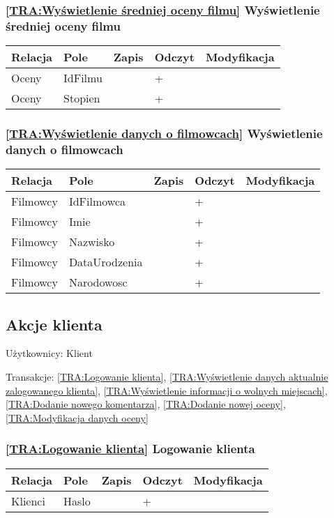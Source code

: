 \subsubsection*{\ref{TRA:Wyświetlenie średniej oceny filmu} Wyświetlenie średniej oceny filmu}
\begin{tabularx}{\textwidth}{|Y|Y|Y|Y|Y|}\hline
Relacja & Pole & Zapis & Odczyt & Modyfikacja \\\hline
Oceny & IdFilmu &  & + & \\
Oceny & Stopien &  & + & \\
\hline\end{tabularx}
\subsubsection*{\ref{TRA:Wyświetlenie danych o filmowcach} Wyświetlenie danych o filmowcach}
\begin{tabularx}{\textwidth}{|Y|Y|Y|Y|Y|}\hline
Relacja & Pole & Zapis & Odczyt & Modyfikacja \\\hline
Filmowcy & IdFilmowca &  & + & \\
Filmowcy & Imie &  & + & \\
Filmowcy & Nazwisko &  & + & \\
Filmowcy & DataUrodzenia &  & + & \\
Filmowcy & Narodowosc &  & + & \\
\hline\end{tabularx}
\subsection{Akcje klienta}
Użytkownicy: Klient

Transakcje: \ref{TRA:Logowanie klienta}, \ref{TRA:Wyświetlenie danych aktualnie zalogowanego klienta}, \ref{TRA:Wyświetlenie informacji o wolnych miejscach}, \ref{TRA:Dodanie nowego komentarza}, \ref{TRA:Dodanie nowej oceny}, \ref{TRA:Modyfikacja danych oceny}
\subsubsection*{\ref{TRA:Logowanie klienta} Logowanie klienta}
\begin{tabularx}{\textwidth}{|Y|Y|Y|Y|Y|}\hline
Relacja & Pole & Zapis & Odczyt & Modyfikacja \\\hline
Klienci & Haslo &  & + & \\
\hline\end{tabularx}
